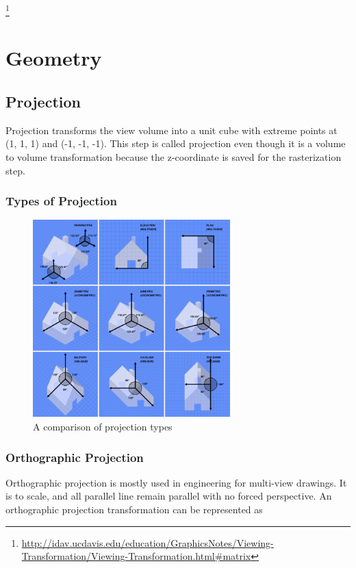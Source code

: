 \documentclass{article}
\begin{document}
\footnote{\url{http://idav.ucdavis.edu/education/GraphicsNotes/Viewing-Transformation/Viewing-Transformation.html\#matrix}}

\section{Geometry}

\subsection{Projection}
Projection transforms the view volume into a unit cube with extreme points at (1, 1, 1) and (-1, -1, -1). This step is called projection even though it is a volume to volume transformation because the z-coordinate is saved for the rasterization step.

\subsubsection{Types of Projection}

\begin{figure}[H]
    \centering
    \includegraphics[width=3.0in]{Graphical_projection_comparison.png}
    \caption{A comparison of projection types}
    \label{projectiontypes}
\end{figure}

\subsubsection{Orthographic Projection}
Orthographic projection is mostly used in engineering for multi-view drawings. It is to scale, and all parallel line remain parallel with no forced perspective. An orthographic projection transformation can be represented as
\end{document}
